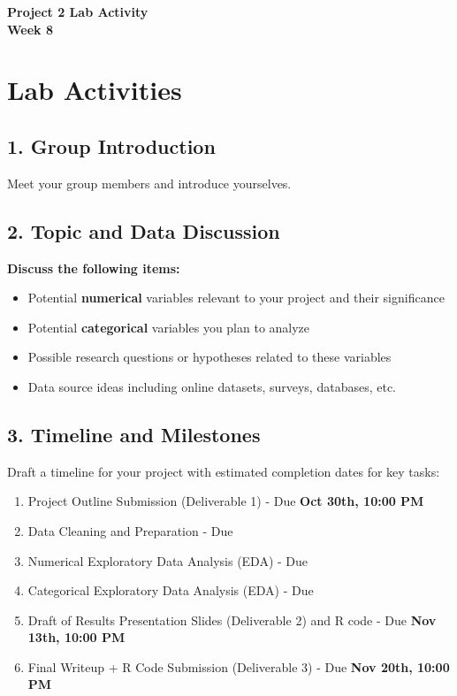 \documentclass[12pt]{article}
\begin{document}
\begin{center}
    \textbf{\LARGE Project 2 Lab Activity \\ Week 8}
\end{center}

\vspace{1em}

\section*{Lab Activities}

\subsection*{1. Group Introduction}
Meet your group members and introduce yourselves.  
\vspace{6\baselineskip}

\subsection*{2. Topic and Data Discussion}

\textbf{Discuss the following items:}

\begin{itemize}
    \item Potential \textbf{numerical} variables relevant to your project and their significance
    \item Potential \textbf{categorical} variables you plan to analyze
    \item Possible research questions or hypotheses related to these variables
    \item Data source ideas including online datasets, surveys, databases, etc.
\end{itemize}

\vspace{6\baselineskip}

\subsection*{3. Timeline and Milestones}
Draft a timeline for your project with estimated completion dates for key tasks:

\begin{enumerate}
    \item Project Outline Submission (Deliverable 1) - Due \textbf{Oct 30th, 10:00 PM}
    \item Data Cleaning and Preparation - Due \underline{\hspace{3cm}} 
    \item Numerical Exploratory Data Analysis (EDA) - Due \underline{\hspace{3cm}}  
    \item Categorical Exploratory Data Analysis (EDA) - Due \underline{\hspace{3cm}}  
    \item Draft of Results Presentation Slides (Deliverable 2) and R code - Due \textbf{Nov 13th, 10:00 PM}
    \item Final Writeup + R Code Submission (Deliverable 3) - Due \textbf{Nov 20th, 10:00 PM}
\end{enumerate}
\end{document}
